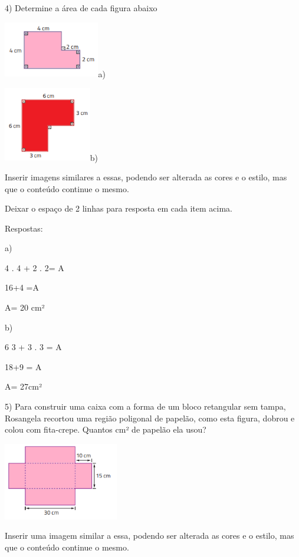 {4) Determine a área de cada figura abaixo

\includegraphics[width=1.65in,height=0.96458in]{./imgSAEB_8_MAT/media/image43.png}a)

\includegraphics[width=1.50833in,height=1.28681in]{./imgSAEB_8_MAT/media/image44.png}b)

Inserir imagens similares a essas, podendo ser alterada as cores e o
estilo, mas que o conteúdo continue o mesmo.

Deixar o espaço de 2 linhas para resposta em cada item acima.

Respostas:

a)

4 . 4 + 2 . 2= A

16+4 =A

A= 20 cm²

b)

\num{6} 3 + 3 . 3 = A

18+9 = A

A= 27cm²

5) Para construir uma caixa com a forma de um bloco retangular sem
tampa, Rosangela recortou uma região poligonal de papelão, como esta
figura, dobrou e colou com fita-crepe. Quantos cm² de papelão ela usou?

\includegraphics[width=1.98333in,height=1.33255in]{./imgSAEB_8_MAT/media/image45.png}

Inserir uma imagem similar a essa, podendo ser alterada as cores e o
estilo, mas que o conteúdo continue o mesmo.

}

